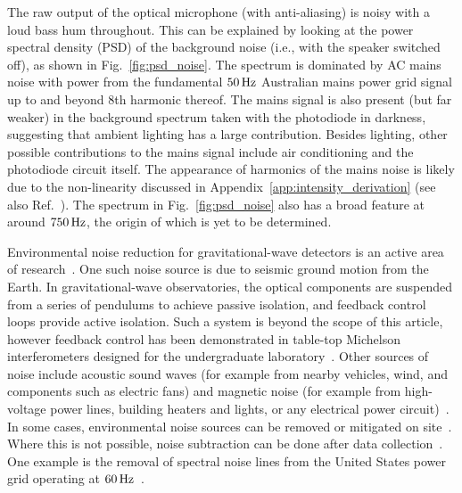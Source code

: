 \documentclass[paper-main.tex]{subfiles}
\begin{document}
The raw output of the optical microphone (with anti-aliasing) is noisy with a loud bass hum throughout. 
This can be explained by looking at the power spectral density (PSD) of the background noise (i.e., with the speaker switched off), as shown in Fig.~\ref{fig:psd_noise}. 
The spectrum is dominated by AC mains noise with power from the fundamental $50\,{\rm Hz}$ Australian mains power grid signal up to and beyond $8$th harmonic thereof. 
The mains signal is also present (but far weaker) in the background spectrum taken with the photodiode in darkness, suggesting that ambient lighting has a large contribution. 
Besides lighting, other possible contributions to the mains signal include air conditioning and the photodiode circuit itself. 
The appearance of harmonics of the mains noise is likely due to the non-linearity discussed in Appendix~\ref{app:intensity_derivation} (see also Ref.~\cite{feynman}). 
The spectrum in Fig.~\ref{fig:psd_noise} also has a broad feature at around $750\,{\rm Hz}$, the origin of which is yet to be determined.


Environmental noise reduction for gravitational-wave detectors is an active area of research~\cite{EfflerEtAl:2015}. 
One such noise source is due to seismic ground motion from the Earth. 
In gravitational-wave observatories, the optical components are suspended from a series of pendulums to achieve passive isolation, and feedback control loops provide active isolation\cite{MatichardEtAl:2015, AdvancedVirgo:2015}. 
Such a system is beyond the scope of this article, however feedback control has been demonstrated in table-top Michelson interferometers designed for the undergraduate laboratory~\cite{LibbrechtBlack:2015}.
Other sources of noise include acoustic sound waves (for example from nearby vehicles, wind, and components such as electric fans) and magnetic noise (for example from high-voltage power lines, building heaters and lights, or any electrical power circuit)~\cite{EfflerEtAl:2015,CironeEtAl:2019}.
In some cases, environmental noise sources can be removed or mitigated on site~\cite{CovasEtAl:2018}. 
Where this is not possible, noise subtraction can be done after data collection~\cite{DriggersEtAl:2019, DavisEtAl:2019}. 
One example is the removal of spectral noise lines from the United States power grid operating at $60\,{\rm Hz}$~\cite{VajenteEtAl:2020}. %
 
\end{document}
